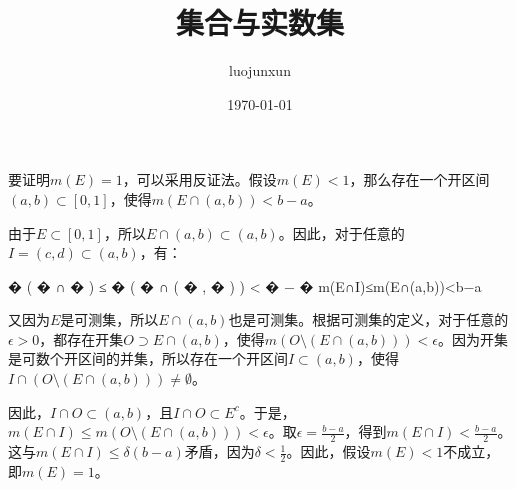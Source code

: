 \documentclass[12pt, a4paper, oneside]{ctexart}
\title{\huge\textbf{集合与实数集}}
\author{luojunxun}
\date{\today}
\begin{document}
\maketitle


要证明$m(E) = 1$，可以采用反证法。假设$m(E) < 1$，那么存在一个开区间$(a,b) \subset [0,1]$，使得$m(E \cap (a,b)) < b - a$。

由于$E \subset [0,1]$，所以$E \cap (a,b) \subset (a,b)$。因此，对于任意的$I = (c,d) \subset (a,b)$，有：

�
(
�
∩
�
)
≤
�
(
�
∩
(
�
,
�
)
)
<
�
−
�
m(E∩I)≤m(E∩(a,b))<b−a

又因为$E$是可测集，所以$E \cap (a,b)$也是可测集。根据可测集的定义，对于任意的$\epsilon > 0$，都存在开集$O \supset E \cap (a,b)$，使得$m(O \setminus (E \cap (a,b))) < \epsilon$。因为开集是可数个开区间的并集，所以存在一个开区间$I \subset (a,b)$，使得$I \cap (O \setminus (E \cap (a,b))) \neq \emptyset$。

因此，$I \cap O \subset (a,b)$，且$I \cap O \subset E^c$。于是，$m(E \cap I) \leq m(O \setminus (E \cap (a,b))) < \epsilon$。取$\epsilon = \frac{b-a}{2}$，得到$m(E \cap I) < \frac{b-a}{2}$。这与$m(E \cap I) \leq \delta(b-a)$矛盾，因为$\delta < \frac{1}{2}$。因此，假设$m(E) < 1$不成立，即$m(E) = 1$。






















% 
% 
\end{document}
